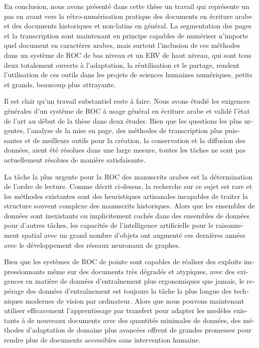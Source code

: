 \begin{french}
En conclusion, nous avons présenté dans cette thèse un travail qui représente
un pas en avant vers la rétro-numérisation pratique des documents en écriture
arabe et des documents historiques et non-latins en général. La segmentation
des pages et la transcription sont maintenant en principe capables de numériser
n'importe quel document en caractères arabes, mais surtout l'inclusion de ces
méthodes dans un système de ROC de bas niveau et un ERV de haut niveau, qui
sont tous deux totalement ouverts à l'adaptation, la réutilisation et le
partage, rendent l'utilisation de ces outils dans les projets de sciences
humaines numériques, petits et grands, beaucoup plus attrayante.

Il est clair qu'un travail substantiel reste à faire. Nous avons étudié les
exigences générales d'un système de ROC à usage général en écriture arabe et
validé l'état de l'art au début de la thèse dans deux études. Bien que les
questions les plus urgentes, l'analyse de la mise en page, des méthodes de
transcription plus puissantes et de meilleurs outils pour la création, la
conservation et la diffusion des données, aient été résolues dans une large
mesure, toutes les tâches ne sont pas actuellement résolues de manière
satisfaisante.

La tâche la plus urgente pour la ROC des manuscrits arabes est la détermination
de l'ordre de lecture. Comme décrit ci-dessus, la recherche sur ce sujet est
rare et les méthodes existantes sont des heuristiques artisanales incapables de
traiter la structure souvent complexe des manuscrits historiques. Alors que les
ensembles de données sont inexistants ou implicitement cachés dans des
ensembles de données pour d'autres tâches, les capacités de l'intelligence
artificielle pour le raisonnement spatial avec un grand nombre d'objets ont
augmenté ces dernières années avec le développement des réseaux neuronaux de
graphes.

Bien que les systèmes de ROC de pointe sont capables de réaliser des exploits
impressionnants même sur des documents très dégradés et atypiques, avec des
exigences en matière de données d'entraînement plus ergonomiques que jamais, le
repérage des données d'entraînement est toujours la tâche la plus longue des
techniques modernes de vision par ordinateur. Alors que nous pouvons maintenant
utiliser efficacement l'apprentissage par transfert pour adapter les modèles
existants à de nouveaux documents avec des quantités minimales de données, des
méthodes d'adaptation de domaine plus avancées offrent de grandes promesses
pour rendre plus de documents accessibles sans intervention humaine.


\end{french}
